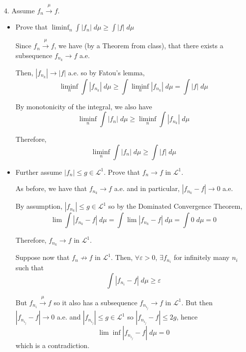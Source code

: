 \documentclass[12pt]{report}
\newcommand{\abs}[1]{\left\vert #1 \right\vert}
\newcommand{\ep}{\varepsilon}
\renewcommand{\L}{\mathcal{L}}
\begin{document}
4. Assume $f_n \overset{\mu}{\longrightarrow} f$.  
\begin{itemize}
    \item Prove that $\liminf_n \int \abs{f_n} \; d\mu \geq \int \abs{f} \; d\mu$ 
    
    \color{blue}
        Since $f_n \overset{\mu}{\longrightarrow} f$, we have (by a Theorem from class), that there exists a subsequence $f_{n_k} \to f$ a.e.

        Then, $\abs{f_{n_k}} \to \abs{f}$ a.e. so by Fatou's lemma,
        \[\liminf_n \int \abs{f_{n_k}} \; d\mu \geq \int \liminf_n \abs{f_{n_k}} \; d\mu = \int \abs{f} \; d\mu\]  

        By monotonicity of the integral, we also have 
        \[\liminf_n \int \abs{f_n} \; d\mu \geq \liminf_n \int \abs{f_{n_k}} \; d\mu\] 
        
        Therefore, 
        \[\liminf_n \int \abs{f_n} \; d\mu \geq \int \abs{f} \; d\mu\]
        
    \color{black}

    \item Further assume $\abs{f_n} \leq g \in \L^1$. Prove that $f_n \to f$ in $\L^1$.
    
    \color{blue}
        As before, we have that $f_{n_k} \to f$ a.e. and in particular, $\abs{f_{n_k} - f} \to 0$ a.e.
        
        By assumption, $\abs{f_{n_k}} \leq g \in \L^1$ so by the Dominated Convergence Theorem,
        \[\lim \int \abs{f_{n_k} - f} \; d\mu = \int \lim \abs{f_{n_k} - f} \; d\mu = \int 0 \; d\mu= 0\]

        Therefore, $f_{n_k} \to f$ in $\L^1$. 

        Suppose now that $f_{n} \not\to f$ in $\L^1$. Then, $\forall \ep > 0$, $\exists f_{n_i}$ for infinitely many $n_i$ such that 
        \[\int \abs{f_{n_i}- f} \; d\mu \geq \ep\]

        But $f_{n_i} \overset{\mu}{\longrightarrow} f$ so it also has a subsequence $f_{n_{i_j}} \to f$ in $\L^1$. But then $\abs{f_{n_{i_j}} - f} \to 0$ a.e. and $\abs{f_{n_{i_j}}} \leq g \in \L^1$ so $\abs{f_{n_{i_j}} - f} \leq 2g$, hence 
        \[\lim \inf \abs{f_{n_{i_j}}- f} \; d\mu =0\]
        which is a contradiction. 
    \color{black}

\end{itemize}
\end{document}
